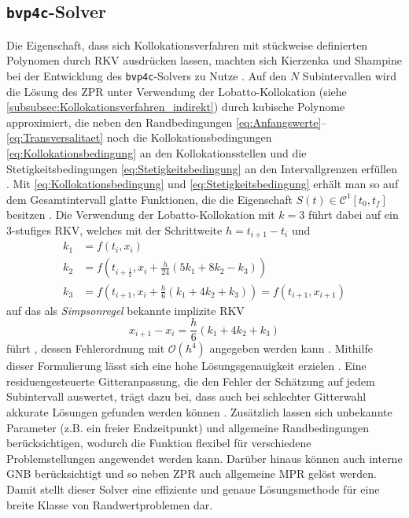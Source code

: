\subsection{\texttt{bvp4c}-Solver}\label{subsec:bvp4c}
Die Eigenschaft, dass sich Kollokationsverfahren mit stückweise definierten Polynomen durch \gls{RKV} ausdrücken lassen, machten sich Kierzenka und Shampine bei der Entwicklung des \texttt{bvp4c}-Solvers zu Nutze \cite{Kierzenka.2001}. Auf den $N$ Subintervallen wird die Lösung des \gls{ZPR} unter Verwendung der Lobatto-Kollokation (siehe \ref{subsubsec:Kollokationsverfahren_indirekt}) durch kubische Polynome approximiert, die neben den Randbedingungen \eqref{eq:Anfangswerte}--\eqref{eq:Transversalitaet} noch die Kollokationsbedingungen \eqref{eq:Kollokationsbedingung} an den Kollokationsstellen und die Stetigkeitsbedingungen \eqref{eq:Stetigkeitsbedingung} an den Intervallgrenzen erfüllen \cite{Kierzenka.2001}. Mit \eqref{eq:Kollokationsbedingung} und \eqref{eq:Stetigkeitsbedingung} erhält man so auf dem Gesamtintervall glatte Funktionen, die die Eigenschaft $S(t) \in \mathcal{C}^1[t_0, t_f]$ besitzen \cite{Kierzenka.2001}. Die Verwendung der Lobatto-Kollokation mit $k=3$ führt dabei auf ein 3-stufiges \gls{RKV}, welches mit der Schrittweite $h=t_{i+1}-t_i$ und  
\begin{align}
	k_1 &= f(t_i,x_i) \\
	k_2 &= f(t_{i+\frac{1}{2}},x_i+\frac{h}{24}(5k_1+8k_2-k_3)) \\
	k_3 &= f(t_{i+1},x_i+\frac{h}{6}(k_1+4k_2+k_3)) = f(t_{i+1},x_{i+1})
\end{align}
auf das als \textit{Simpsonregel} bekannte implizite \gls{RKV}
\begin{equation}
	x_{i+1} - x_i = \frac{h}{6}(k_1+4k_2+k_3)
\end{equation} 
führt \cite{Cash.1980}, dessen Fehlerordnung mit $\mathcal{O}(h^4)$ angegeben werden kann \cite{Kierzenka.2001}. Mithilfe dieser Formulierung lässt sich eine hohe Lösungsgenauigkeit erzielen \cite{Kierzenka.2001}. Eine residuengesteuerte Gitteranpassung, die den Fehler der Schätzung auf jedem Subintervall auswertet, trägt dazu bei, dass auch bei schlechter Gitterwahl akkurate Lösungen gefunden werden können \cite{Kierzenka.2001}. Zusätzlich lassen sich unbekannte Parameter (z.B. ein freier Endzeitpunkt) und allgemeine Randbedingungen berücksichtigen, wodurch die Funktion flexibel für verschiedene Problemstellungen angewendet werden kann. Darüber hinaus können auch interne \gls{GNB} berücksichtigt und so neben \gls{ZPR} auch allgemeine \gls{MPR} gelöst werden. Damit stellt dieser Solver eine effiziente und genaue Lösungsmethode für eine breite Klasse von Randwertproblemen dar. 
